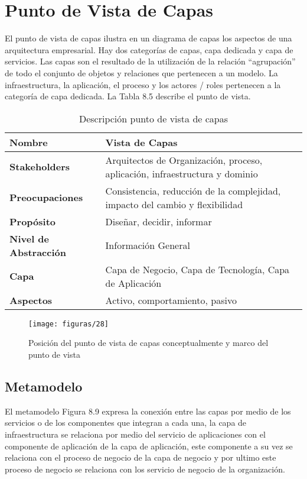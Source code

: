 \section{Punto de Vista de Capas}
El punto de vista de capas ilustra en un diagrama de capas los aspectos de una arquitectura
empresarial. Hay dos categorías de capas, capa dedicada y capa de servicios. Las capas
son el resultado de la utilización de la relación “agrupación” de todo el conjunto de objetos
y relaciones que pertenecen a un modelo. La infraestructura, la aplicación, el proceso
y los actores / roles pertenecen a la categoría de capa dedicada. La Tabla 8.5 describe el
punto de vista.
    
  \begin{table}[H]
  	\centering
   	\begin{tabular}{lp{8cm}}
   		\toprule
   		\textbf{Nombre} & \textbf{Vista de Capas} \\
   		\midrule
   		\textbf{Stakeholders} & Arquitectos de Organización, proceso, aplicación, infraestructura y dominio \\
   		\textbf{Preocupaciones} & Consistencia, reducción de la complejidad, impacto del cambio y flexibilidad \\
   		\textbf{Propósito} & Diseñar, decidir, informar \\
   		\textbf{Nivel de Abstracción} & Información General \\
   		\textbf{Capa} & Capa de Negocio, Capa de Tecnología, Capa de Aplicación \\
   		\textbf{Aspectos} & Activo, comportamiento, pasivo \\
   		\bottomrule
   	\end{tabular}
   	\captionsetup{width=.95\textwidth}
   	\caption{Descripción punto de vista de capas}
   	\label{tabla19}
  \end{table}
    
  \begin{figure}[H]
   	\centering
   	\texttt{[image: figuras/28]}
   	\captionsetup{width=.95\textwidth}
   	\caption{Posición del punto de vista de capas conceptualmente y marco del punto de vista}
   	\label{figura28}
   \end{figure}
   
   \subsection{Metamodelo}
   El metamodelo Figura 8.9 expresa la conexión entre las capas por medio de los servicios o de los componentes que integran a cada una, la capa de infraestructura se relaciona por medio del servicio de aplicaciones con el componente de aplicación de la capa de aplicación, este componente a su vez se relaciona con el proceso de negocio de la capa de negocio y por ultimo este proceso de negocio se relaciona con los servicio de negocio de la organización.
  
